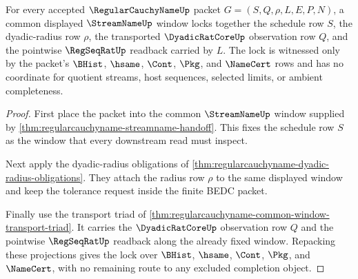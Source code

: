 \begin{theorem}
\label{thm:regularcauchyname-schedule-radius-lock}
For every accepted $\RegularCauchyNameUp$ packet $G=(S,Q,\rho,L,E,P,N)$, a common displayed $\StreamNameUp$ window locks together the schedule row $S$, the dyadic-radius row $\rho$, the transported $\DyadicRatCoreUp$ observation row $Q$, and the pointwise $\RegSeqRatUp$ readback carried by $L$. The lock is witnessed only by the packet's $\BHist$, $\hsame$, $\Cont$, $\Pkg$, and $\NameCert$ rows and has no coordinate for quotient streams, host sequences, selected limits, or ambient completeness.
\end{theorem}
\begin{proof}
First place the packet into the common $\StreamNameUp$ window supplied by \autoref{thm:regularcauchyname-streamname-handoff}. This fixes the schedule row $S$ as the window that every downstream read must inspect.

Next apply the dyadic-radius obligations of \autoref{thm:regularcauchyname-dyadic-radius-obligations}. They attach the radius row $\rho$ to the same displayed window and keep the tolerance request inside the finite BEDC packet.

Finally use the transport triad of \autoref{thm:regularcauchyname-common-window-transport-triad}. It carries the $\DyadicRatCoreUp$ observation row $Q$ and the pointwise $\RegSeqRatUp$ readback along the already fixed window. Repacking these projections gives the lock over $\BHist$, $\hsame$, $\Cont$, $\Pkg$, and $\NameCert$, with no remaining route to any excluded completion object.
\end{proof}


